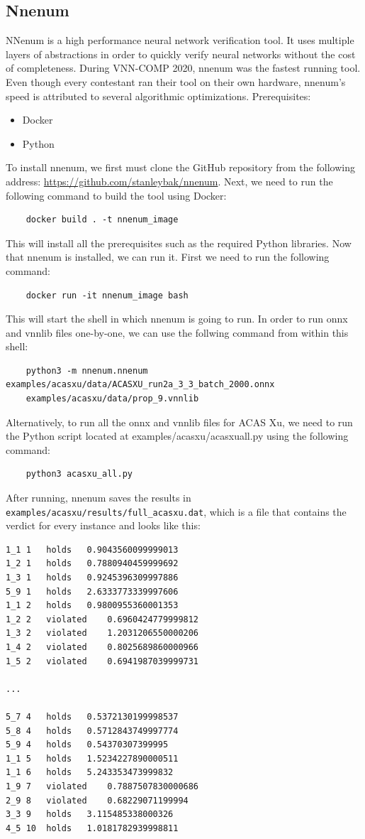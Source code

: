 \documentclass{article}
\begin{document}
\subsection{Nnenum \cite{nnenum}}
NNenum is a high performance neural network verification tool. It uses multiple layers of abstractions in order to quickly verify neural networks without the cost of completeness. During VNN-COMP 2020, nnenum was the fastest running tool. Even though every contestant ran their tool on their own hardware, nnenum's speed is attributed to several algorithmic optimizations\cite{bak2021nfm}.
\newline
Prerequisites: 
\begin{itemize}
    \item Docker
    \item Python
\end{itemize}
To install nnenum, we first must clone the GitHub repository from the following address:  \url{https://github.com/stanleybak/nnenum}.
Next, we need to run the following command to build the tool using Docker:
\begin{verbatim}
    docker build . -t nnenum_image
\end{verbatim}
This will install all the prerequisites such as the required Python libraries.
\newline
Now that nnenum is installed, we can run it. First we need to run the following command:
\begin{verbatim}
    docker run -it nnenum_image bash
\end{verbatim}
This will start the shell in which nnenum is going to run.
\newline
In order to run onnx and vnnlib files one-by-one, we can use the follwing command from within this shell:
\begin{verbatim}
    python3 -m nnenum.nnenum examples/acasxu/data/ACASXU_run2a_3_3_batch_2000.onnx
    examples/acasxu/data/prop_9.vnnlib
\end{verbatim}
Alternatively, to run all the onnx and vnnlib files for ACAS Xu, we need to run the Python script located at examples/acasxu/acasxu\textunderscore all.py using the following command:
\begin{verbatim}
    python3 acasxu_all.py
\end{verbatim}
After running, nnenum saves the results in \verb|examples/acasxu/results/full_acasxu.dat|, which is a file that contains the verdict for every instance and looks like this:
\begin{verbatim}
1_1	1	holds	0.9043560099999013
1_2	1	holds	0.7880940459999692
1_3	1	holds	0.9245396309997886
5_9	1	holds	2.6333773339997606
1_1	2	holds	0.9800955360001353
1_2	2	violated	0.6960424779999812
1_3	2	violated	1.2031206550000206
1_4	2	violated	0.8025689860000966
1_5	2	violated	0.6941987039999731

...

5_7	4	holds	0.5372130199998537
5_8	4	holds	0.5712843749997774
5_9	4	holds	0.54370307399995
1_1	5	holds	1.5234227890000511
1_1	6	holds	5.243353473999832
1_9	7	violated	0.7887507830000686
2_9	8	violated	0.68229071199994
3_3	9	holds	3.115485338000326
4_5	10	holds	1.0181782939998811
\end{verbatim}
\end{document}
